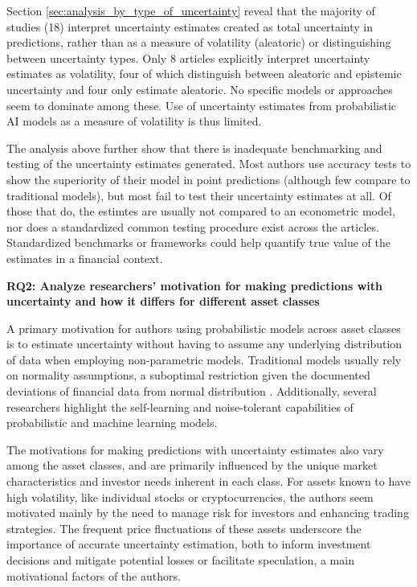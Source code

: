 Section \ref{sec:analysis_by_type_of_uncertainty} reveal that the majority of studies (18) interpret uncertainty estimates created as total uncertainty in predictions, rather than as a measure of volatility (aleatoric) or distinguishing between uncertainty types. Only 8 articles explicitly interpret uncertainty estimates as volatility, four of which distinguish between aleatoric and epistemic uncertainty and four only estimate aleatoric. No specific models or approaches seem to dominate among these. Use of uncertainty estimates from probabilistic AI models as a measure of volatility is thus limited. 

The analysis above further show that there is inadequate benchmarking and testing of the uncertainty estimates generated. Most authors use accuracy tests to show the superiority of their model in point predictions (although few compare to traditional models), but most fail to test their uncertainty estimates at all. Of those that do, the estimtes are usually not compared to an econometric model, nor does a standardized common testing procedure exist across the articles.  
Standardized benchmarks or frameworks could help quantify true value of the estimates in a financial context.

\textbf{RQ2: Analyze researchers' motivation for making predictions with uncertainty and how it differs for different asset classes}\nopagebreak

A primary motivation for authors using probabilistic models across asset classes is to estimate uncertainty without having to assume any underlying distribution of data when employing non-parametric models. Traditional models usually rely on normality assumptions, a suboptimal restriction given the documented deviations of financial data from normal distribution \parencite{Peir1994TheDO}. Additionally, several researchers highlight the self-learning and noise-tolerant capabilities of probabilistic and machine learning models.

The motivations for making predictions with uncertainty estimates also vary among the asset classes, and are primarily influenced by the unique market characteristics and investor needs inherent in each class. For assets known to have high volatility, like individual stocks or cryptocurrencies, the authors seem motivated mainly by the need to manage risk for investors and enhancing trading strategies. The frequent price fluctuations of these assets underscore the importance of accurate uncertainty estimation, both to inform investment decisions and mitigate potential losses or facilitate speculation, a main motivational factors of the authors. 

